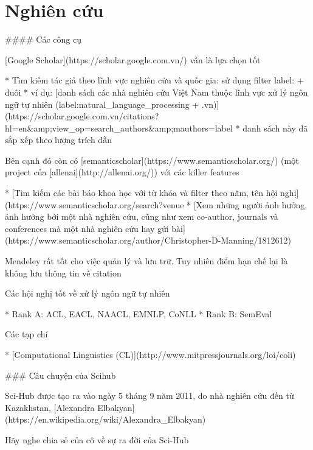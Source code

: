 \chapter{Nghiên cứu}

#### Các công cụ

[Google Scholar](https://scholar.google.com.vn/) vẫn là lựa chọn tốt

* Tìm kiếm tác giả theo lĩnh vực nghiên cứu và quốc gia: sử dụng filter label: + đuôi 
    * ví dụ: [danh sách các nhà nghiên cứu Việt Nam thuộc lĩnh vực xử lý ngôn ngữ tự nhiên (label:natural_language_processing + .vn)](https://scholar.google.com.vn/citations?hl=en&amp;view_op=search_authors&amp;mauthors=label%
    * danh sách này đã sắp xếp theo lượng trích dẫn

Bên cạnh đó còn có [semanticscholar](https://www.semanticscholar.org/) (một project của [allenai](http://allenai.org/)) với các killer features

* [Tìm kiếm các bài báo khoa học với từ khóa và filter theo năm, tên hội nghị](https://www.semanticscholar.org/search?venue%
* [Xem những người ảnh hưởng, ảnh hưởng bởi một nhà nghiên cứu, cũng như xem co-author, journals và conferences mà một nhà nghiên cứu hay gửi bài](https://www.semanticscholar.org/author/Christopher-D-Manning/1812612)

Mendeley rất tốt cho việc quản lý và lưu trữ. Tuy nhiên điểm hạn chế lại là không lưu thông tin về citation

Các hội nghị tốt về xử lý ngôn ngữ tự nhiên

* Rank A: ACL, EACL, NAACL, EMNLP, CoNLL
* Rank B: SemEval

Các tạp chí

* [Computational Linguistics (CL)](http://www.mitpressjournals.org/loi/coli)

### Câu chuyện của Scihub

Sci-Hub được tạo ra vào ngày 5 tháng 9 năm 2011, do nhà nghiên cứu đến từ Kazakhstan, [Alexandra Elbakyan](https://en.wikipedia.org/wiki/Alexandra_Elbakyan)

Hãy nghe chia sẻ của cô về sự ra đời của Sci-Hub

